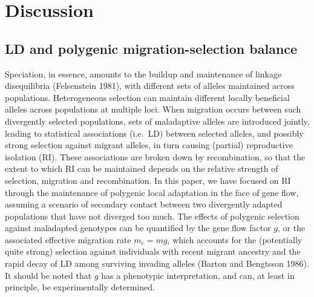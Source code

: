 \documentclass[
  11pt,
]{article}
\begin{document}
\hypertarget{discussion}{%
\section{Discussion}\label{discussion}}

\hypertarget{ld-and-polygenic-migration-selection-balance}{%
\subsection{LD and polygenic migration-selection
balance}\label{ld-and-polygenic-migration-selection-balance}}

Speciation, in essence, amounts to the buildup and maintenance of
linkage disequilibria (Felsenstein 1981), with different sets of alleles
maintained across populations. Heterogeneous selection can maintain
different locally beneficial alleles across populations at multiple
loci. When migration occurs between such divergently selected
populations, sets of maladaptive alleles are introduced jointly, leading
to statistical associations (i.e.~LD) between selected alleles, and
possibly strong selection against migrant alleles, in turn causing
(partial) reproductive isolation (RI). These associations are broken
down by recombination, so that the extent to which RI can be maintained
depends on the relative strength of selection, migration and
recombination. In this paper, we have focused on RI through the
maintenance of polygenic local adaptation in the face of gene flow,
assuming a scenario of secondary contact between two divergently adapted
populations that have not diverged too much. The effects of polygenic
selection against maladapted genotypes can be quantified by the gene
flow factor \(g\), or the associated effective migration rate
\(m_e = mg\), which accounts for the (potentially quite strong)
selection against individuals with recent migrant ancestry and the rapid
decay of LD among surviving invading alleles (Barton and Bengtsson
1986). It should be noted that \(g\) has a phenotypic interpretation,
and can, at least in principle, be experimentally determined.
\end{document}
